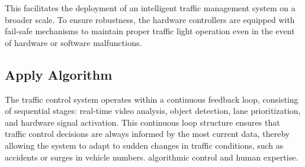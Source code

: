 \documentclass[usenatbib]{tjaa}
\begin{document}
This facilitates the deployment of an intelligent traffic management system on a broader scale. To ensure robustness, the hardware controllers are equipped with fail-safe mechanisms to maintain proper traffic light operation even in the event of hardware or software malfunctions.


\subsection[]{Apply Algorithm}

The traffic control system operates within a continuous feedback loop, 
consisting of sequential stages: real-time video analysis, object detection, lane prioritization, and hardware signal activation. This continuous loop structure ensures that traffic control decisions are always informed by the most current data, thereby allowing the system to adapt to sudden changes in traffic conditions, such as accidents or surges in vehicle numbers.  algorithmic control and human expertise.
\noindent %
\end{document}
